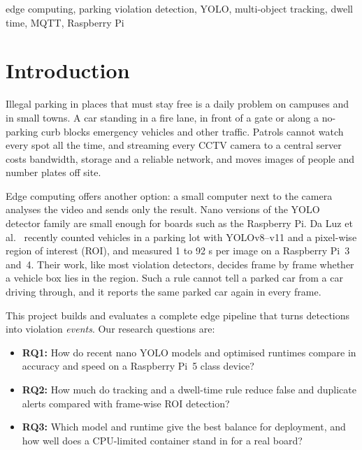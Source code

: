 \documentclass[conference]{IEEEtran}
\begin{document}
\begin{IEEEkeywords}
edge computing, parking violation detection, YOLO, multi-object tracking, dwell time, MQTT, Raspberry Pi
\end{IEEEkeywords}

\section{Introduction}
Illegal parking in places that must stay free is a daily problem on campuses and in small towns. A car standing in a fire lane, in front of a gate or along a no-parking curb blocks emergency vehicles and other traffic. Patrols cannot watch every spot all the time, and streaming every CCTV camera to a central server costs bandwidth, storage and a reliable network, and moves images of people and number plates off site.

Edge computing offers another option: a small computer next to the camera analyses the video and sends only the result. Nano versions of the YOLO detector family are small enough for boards such as the Raspberry Pi. Da Luz et al.~\cite{daluz2026} recently counted vehicles in a parking lot with YOLOv8--v11 and a pixel-wise region of interest (ROI), and measured 1 to 92 s per image on a Raspberry Pi~3 and~4. Their work, like most violation detectors, decides frame by frame whether a vehicle box lies in the region. Such a rule cannot tell a parked car from a car driving through, and it reports the same parked car again in every frame.

This project builds and evaluates a complete edge pipeline that turns detections into violation \emph{events}. Our research questions are:
\begin{itemize}
\item \textbf{RQ1:} How do recent nano YOLO models and optimised runtimes compare in accuracy and speed on a Raspberry Pi~5 class device?
\item \textbf{RQ2:} How much do tracking and a dwell-time rule reduce false and duplicate alerts compared with frame-wise ROI detection?
\item \textbf{RQ3:} Which model and runtime give the best balance for deployment, and how well does a CPU-limited container stand in for a real board?
\end{itemize}
\end{document}
